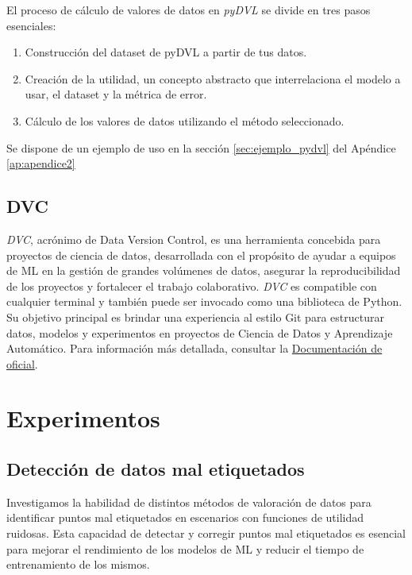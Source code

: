 El proceso de cálculo de valores de datos en
\textit{pyDVL} se divide en tres pasos esenciales:
\begin{enumerate}
    \item Construcción del dataset de pyDVL a
    partir de tus datos.
    \item Creación de la utilidad, un concepto abstracto
    que interrelaciona el modelo a usar, el dataset y la
    métrica de error.
    \item Cálculo de los valores de datos utilizando el
    método seleccionado.
\end{enumerate}
Se dispone de un ejemplo de uso en la sección \ref{sec:ejemplo_pydvl}
del Apéndice \ref{ap:apendice2}


\subsection*{DVC}

\textit{DVC}, acrónimo de Data Version Control,
es una herramienta concebida para proyectos de ciencia de
datos, desarrollada con el propósito de ayudar a equipos de
ML en la gestión de grandes volúmenes de datos,
asegurar la reproducibilidad de los proyectos y fortalecer el
trabajo colaborativo. \textit{DVC} es compatible con
cualquier terminal y también puede ser invocado como
una biblioteca de Python. Su objetivo principal es brindar una
experiencia al estilo Git para estructurar datos, modelos y
experimentos en proyectos de Ciencia de Datos y Aprendizaje
Automático. Para información más detallada, consultar
la \href{https://dvc.org/doc/user-guide}{Documentación de oficial}.

\newpage

\section{Experimentos}
\subsection{Detección de datos mal etiquetados}

Investigamos la habilidad de distintos métodos de
valoración de datos para identificar puntos mal
etiquetados en escenarios con funciones de utilidad ruidosas.
Esta capacidad de detectar y corregir puntos mal etiquetados
es esencial para mejorar el rendimiento de los modelos de
ML y reducir el tiempo de entrenamiento de
los mismos.

